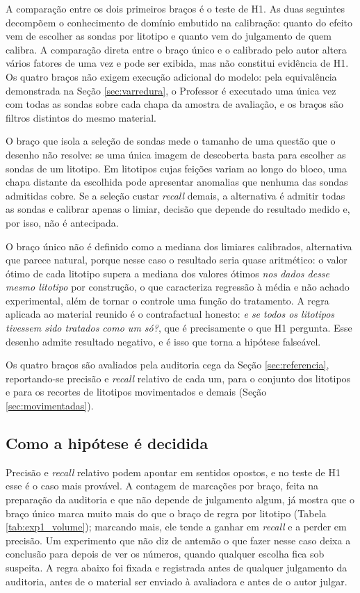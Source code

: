 A comparação entre os dois primeiros braços é o teste de H1. As duas seguintes decompõem o conhecimento de domínio embutido na calibração: quanto do efeito vem de escolher as sondas por litotipo e quanto vem do julgamento de quem calibra. A comparação direta entre o braço único e o calibrado pelo autor altera vários fatores de uma vez e pode ser exibida, mas não constitui evidência de H1. Os quatro braços não exigem execução adicional do modelo: pela equivalência demonstrada na Seção \ref{sec:varredura}, o Professor é executado uma única vez com todas as sondas sobre cada chapa da amostra de avaliação, e os braços são filtros distintos do mesmo material.

O braço que isola a seleção de sondas mede o tamanho de uma questão que o desenho não resolve: se uma única imagem de descoberta basta para escolher as sondas de um litotipo. Em litotipos cujas feições variam ao longo do bloco, uma chapa distante da escolhida pode apresentar anomalias que nenhuma das sondas admitidas cobre. Se a seleção custar \textit{recall} demais, a alternativa é admitir todas as sondas e calibrar apenas o limiar, decisão que depende do resultado medido e, por isso, não é antecipada.

O braço único não é definido como a mediana dos limiares calibrados, alternativa que parece natural, porque nesse caso o resultado seria quase aritmético: o valor ótimo de cada litotipo supera a mediana dos valores ótimos \textit{nos dados desse mesmo litotipo} por construção, o que caracteriza regressão à média e não achado experimental, além de tornar o controle uma função do tratamento. A regra aplicada ao material reunido é o contrafactual honesto: \textit{e se todos os litotipos tivessem sido tratados como um só?}, que é precisamente o que H1 pergunta. Esse desenho admite resultado negativo, e é isso que torna a hipótese falseável.

Os quatro braços são avaliados pela auditoria cega da Seção \ref{sec:referencia}, reportando-se precisão e \textit{recall} relativo de cada um, para o conjunto dos litotipos e para os recortes de litotipos movimentados e demais (Seção \ref{sec:movimentadas}).

\subsection{Como a hipótese é decidida}
\label{sec:decisao_h1}

Precisão e \textit{recall} relativo podem apontar em sentidos opostos, e no teste de H1 esse é o caso mais provável. A contagem de marcações por braço, feita na preparação da auditoria e que não depende de julgamento algum, já mostra que o braço único marca muito mais do que o braço de regra por litotipo (Tabela \ref{tab:exp1_volume}); marcando mais, ele tende a ganhar em \textit{recall} e a perder em precisão. Um experimento que não diz de antemão o que fazer nesse caso deixa a conclusão para depois de ver os números, quando qualquer escolha fica sob suspeita. A regra abaixo foi fixada e registrada antes de qualquer julgamento da auditoria, antes de o material ser enviado à avaliadora e antes de o autor julgar.


